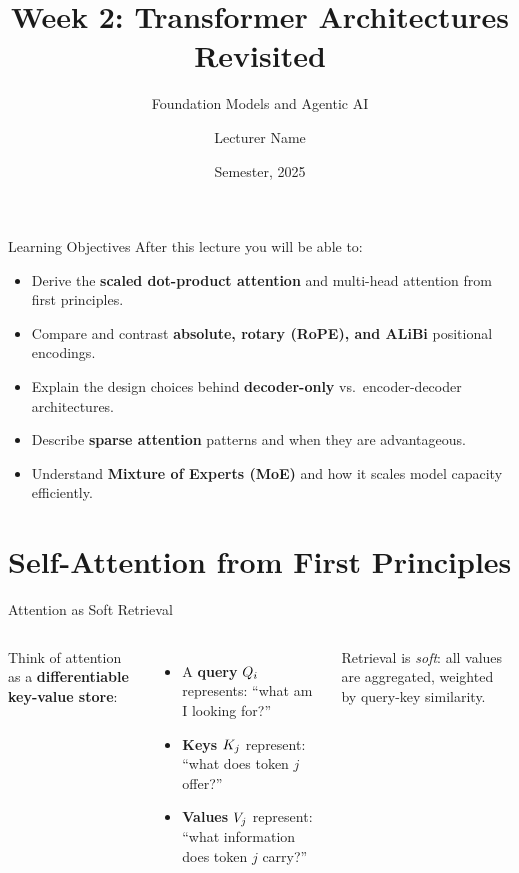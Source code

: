 \documentclass[aspectratio=169,10pt]{beamer}
\title{Week 2: Transformer Architectures Revisited}
\subtitle{Foundation Models and Agentic AI}
\author{Lecturer Name}
\institute{Holon Institute of Technology (HIT)}
\date{Semester, 2025}
\begin{document}
\begin{frame}
  \titlepage
\end{frame}

\begin{frame}{Learning Objectives}
  After this lecture you will be able to:
  \begin{itemize}
    \item Derive the \textbf{scaled dot-product attention} and multi-head attention from first principles.
    \item Compare and contrast \textbf{absolute, rotary (RoPE), and ALiBi} positional encodings.
    \item Explain the design choices behind \textbf{decoder-only} vs.\ encoder-decoder architectures.
    \item Describe \textbf{sparse attention} patterns and when they are advantageous.
    \item Understand \textbf{Mixture of Experts (MoE)} and how it scales model capacity efficiently.
  \end{itemize}
\end{frame}

\section{Self-Attention from First Principles}

\begin{frame}{Attention as Soft Retrieval}
  \begin{columns}[T]
      Think of attention as a \textbf{differentiable key-value store}:
      \begin{itemize}
        \item A \textbf{query} $Q_i$ represents: ``what am I looking for?''
        \item \textbf{Keys} $K_j$ represent: ``what does token $j$ offer?''
        \item \textbf{Values} $V_j$ represent: ``what information does token $j$ carry?''
      \end{itemize}
      \vspace{0.4em}
      Retrieval is \emph{soft}: all values are aggregated,
      weighted by query-key similarity.
      
  \end{columns}
\end{frame}
\end{document}
